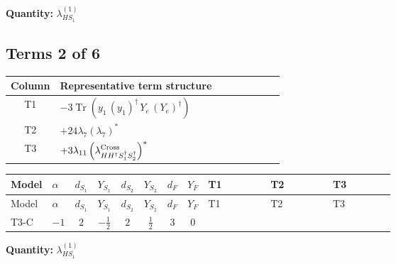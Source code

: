 \documentclass[8pt]{article}
\begin{document}
\begin{landscape}
\begin{longtable}{@{}llcccccc >{\raggedright\arraybackslash}p{0.21\linewidth} >{\raggedright\arraybackslash}p{0.21\linewidth} >{\raggedright\arraybackslash}p{0.21\linewidth}@{}}
\midrule
\bottomrule
\end{longtable}
\clearpage
\noindent\textbf{Quantity: }$\lambda_{HS_1}^{(1)}$\par\smallskip
\subsection*{Terms 2 of 6}
\begin{center}
\begin{tabular}{@{}c >{\raggedright\arraybackslash}p{0.82\linewidth}@{}}
\toprule
Column & Representative term structure \\
\midrule
T1 & \(\displaystyle -3 \operatorname{Tr}\!\left({y_1}\,\left({y_1}\right)^{\dagger}\,{Y_e}\,\left({Y_e}\right)^{\dagger}\right)\) \\
\midrule
T2 & \(\displaystyle +24 {\lambda_{7}} \left({\lambda_{7}}\right)^{*}\) \\
\midrule
T3 & \(\displaystyle +3 {\lambda_{11}} \left({\lambda_{H H^\dagger S_1^\dagger S_2^\dagger}^{\rm Cross}}\right)^{*}\) \\
\midrule
\bottomrule
\end{tabular}
\end{center}
\smallskip
\tiny
\begin{longtable}{@{}llcccccc >{\raggedright\arraybackslash}p{0.21\linewidth} >{\raggedright\arraybackslash}p{0.21\linewidth} >{\raggedright\arraybackslash}p{0.21\linewidth}@{}}
\toprule
Model & $\alpha$ & $d_{S_1}$ & $Y_{S_1}$ & $d_{S_2}$ & $Y_{S_2}$ & $d_F$ & $Y_F$ & T1 & T2 & T3 \\
\midrule
\endfirsthead
\toprule
Model & $\alpha$ & $d_{S_1}$ & $Y_{S_1}$ & $d_{S_2}$ & $Y_{S_2}$ & $d_F$ & $Y_F$ & T1 & T2 & T3 \\
\midrule
\endhead
T3-C & $-1$ & $2$ & $-\frac{1}{2}$ & $2$ & $\frac{1}{2}$ & $3$ & $0$ & \scriptsize\adjustbox{max width=\linewidth}{$\begin{gathered} -3 \operatorname{Tr}\!\left({y_1}\,\left({y_1}\right)^{\dagger}\,{Y_e}\,\left({Y_e}\right)^{\dagger}\right)\end{gathered}$} & \scriptsize\adjustbox{max width=\linewidth}{$\begin{gathered} +24 {\lambda_{7}} \left({\lambda_{7}}\right)^{*}\end{gathered}$} & \scriptsize\adjustbox{max width=\linewidth}{$\begin{gathered} +3 {\lambda_{11}} \left({\lambda_{H H^\dagger S_1^\dagger S_2^\dagger}^{\rm Cross}}\right)^{*}\end{gathered}$} \\
\midrule
\bottomrule
\end{longtable}
\clearpage
\noindent\textbf{Quantity: }$\lambda_{HS_1}^{(1)}$\par\smallskip

\end{landscape}
\end{document}
